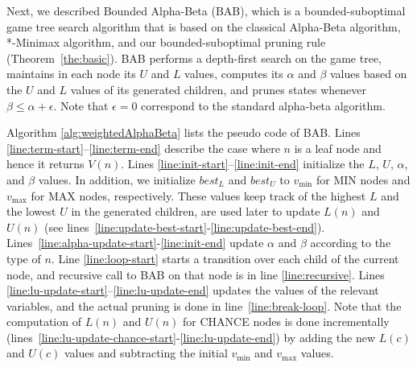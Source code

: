 \documentclass[letterpaper]{article} %
\newcommand{\MM}{\mathit{V}}
\newcommand{\pess}{\mathit{L}}
\newcommand{\opti}{\mathit{U}}
\newcommand{\besto}{\mathit{best}_{\opti}}
\newcommand{\bestp}{\mathit{best}_{\pess}}
\newcommand{\vmax}{v_{\text{max}}}
\newcommand{\vmin}{v_{\text{min}}}
\begin{document}
Next, we described Bounded Alpha-Beta (BAB), which is a bounded-suboptimal game tree search algorithm 
that is based on the classical Alpha-Beta algorithm, *-Minimax algorithm, and our bounded-suboptimal pruning rule (Theorem~\ref{the:basic}). 
BAB performs a depth-first search on the game tree, maintains in each node its $\opti$ and $\pess$ values, computes its $\alpha$ and $\beta$ values based on the $\opti$ and $\pess$ values of its generated children, and prunes states whenever $\beta \leq \alpha+\epsilon$. Note that $\epsilon=0$ correspond to the standard alpha-beta algorithm.


Algorithm \ref{alg:weightedAlphaBeta} lists the pseudo code of BAB.
Lines \ref{line:term-start}--\ref{line:term-end} describe the case where $n$ is a leaf node and hence it returns $\MM(n)$. %
Lines \ref{line:init-start}--\ref{line:init-end} initialize the $\pess$, $\opti$, $\alpha$, and $\beta$ values. In addition, we 
initialize $\bestp$ and $\besto$ to $\vmin{}$ for MIN nodes and $\vmax{}$ for MAX nodes, respectively.
These values keep track of the highest $\pess{}$ and the lowest $\opti{}$ in the generated children, are used later to update $\pess(n)$ and $\opti(n)$ (see lines~\ref{line:update-best-start}-\ref{line:update-best-end}). 
Lines~\ref{line:alpha-update-start}-\ref{line:init-end} update $\alpha$ and $\beta$ according to the type of $n$. 
Line \ref{line:loop-start} starts a transition over each child of the current node, and recursive call to BAB on that node is 
in line \ref{line:recursive}. Lines \ref{line:lu-update-start}--\ref{line:lu-update-end} updates 
the values of the relevant variables, and the actual pruning is done in line~\ref{line:break-loop}. 
Note that the computation of $\pess(n)$ and $\opti(n)$ for CHANCE nodes is done incrementally (lines~\ref{line:lu-update-chance-start}-\ref{line:lu-update-end}) by adding the new $\pess(c)$ and $\opti(c)$ values and subtracting the initial $\vmin$ and $\vmax$ values.
\end{document}

